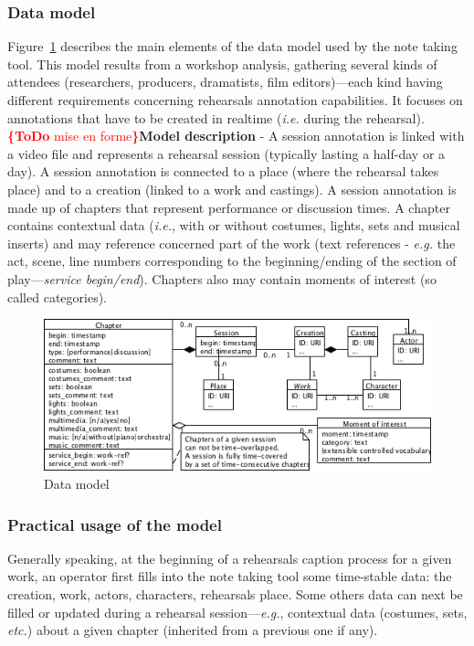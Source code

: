 \documentclass[conference]{IEEEtran}
\newcommand{\todo}[1]{\noindent\textcolor{red}{{\bf \{ToDo} #1{\bf \}}}}
\begin{document}
\subsubsection{Data model} Figure~\ref{fig_data_model} describes the main elements of the data model used by the note taking tool. This model results from a workshop analysis, gathering several kinds of attendees (researchers, producers, dramatists, film editors)---each kind having different requirements concerning rehearsals annotation capabilities. It focuses on annotations that have to be created in realtime (\emph{i.e.} during the rehearsal). \newline
\todo{mise en forme}\textbf{Model description} - A session annotation is linked with a video file and represents a rehearsal session (typically lasting a half-day or a day). A session annotation is connected to a place (where the rehearsal takes place) and to a creation (linked to a work and castings). A session annotation is made up of chapters that represent performance or discussion times. A chapter contains contextual data (\emph{i.e.}, with or without costumes, lights, sets and musical inserts) and may reference concerned part of the work (text references - \emph{e.g.} the act, scene, line numbers corresponding to the beginning/ending of the section of play---\textit{service begin/end}). Chapters also may contain moments of interest (so called categories).
\begin{figure}[ht]
\centering
\includegraphics[width=\columnwidth]{UMLet_Data_model}
\caption{Data model}
\label{fig_data_model}
\end{figure}
\subsubsection{Practical usage of the model} Generally speaking, at the beginning of a rehearsals caption process for a given work, an operator first fills into the note taking tool some time-stable data: the creation, work, actors, characters, rehearsals place. Some others data can next be filled or updated during a rehearsal session---\emph{e.g.}, contextual data (costumes, sets, \emph{etc.}) about a given chapter (inherited from a previous one if any).
\end{document}

